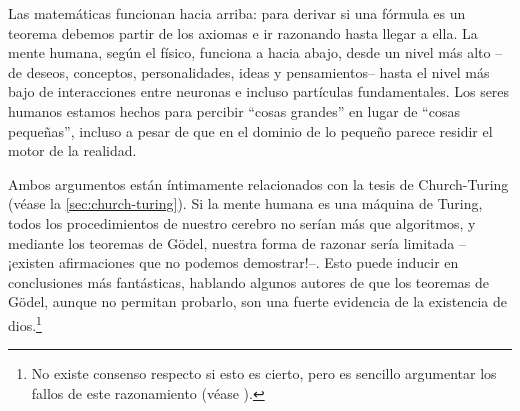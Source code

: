 Las matemáticas funcionan hacia arriba: para derivar si una fórmula es un teorema debemos partir de los axiomas e ir razonando hasta llegar a ella. La mente humana, según el físico, funciona a hacia abajo, desde un nivel más alto --de deseos, conceptos, personalidades, ideas y pensamientos-- hasta el nivel más bajo de interacciones entre neuronas e incluso partículas fundamentales. Los seres humanos estamos hechos para percibir ``cosas grandes'' en lugar de ``cosas pequeñas'', incluso a pesar de que en el dominio de lo pequeño parece residir el motor de la realidad.

Ambos argumentos están íntimamente relacionados con la tesis de Church-Turing (véase la \cref{sec:church-turing}). Si la mente humana es una máquina de Turing, todos los procedimientos de nuestro cerebro no serían más que algoritmos, y mediante los teoremas de Gödel, nuestra forma de razonar sería limitada --¡existen afirmaciones que no podemos demostrar!--. Esto puede inducir en conclusiones más fantásticas, hablando algunos autores de que los teoremas de Gödel, aunque no permitan probarlo, son una fuerte evidencia de la existencia de dios.\footnote{No existe consenso respecto si esto es cierto, pero es sencillo argumentar los fallos de este razonamiento (véase \cite{StanfordGodel2022}).} \cite{StanfordGodel2022}








